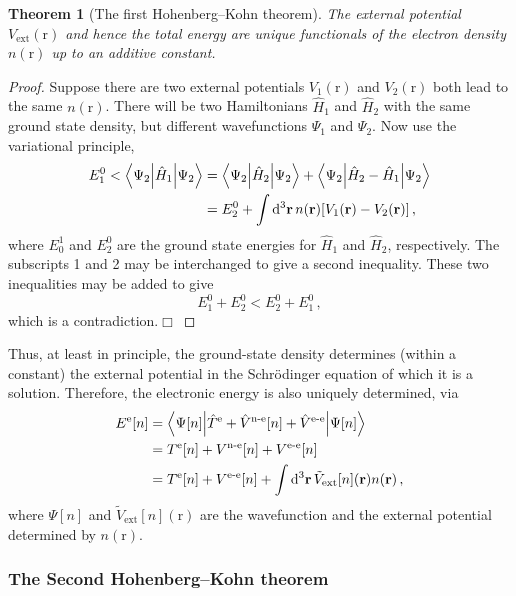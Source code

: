 \documentclass{article}
\theoremstyle{plain}\theoremheaderfont{\normalfont\itshape}\theorembodyfont{\rmfamily}\theoremseparator{.}\newtheorem*{rem}{Remark}\newtheorem*{ex}{Example}\newtheorem*{proof}{Proof}\newtheorem*{altp}{Alternative proof}
\theoremstyle{plain}\theoremheaderfont{\normalfont\bfseries}\theorembodyfont{\rmfamily}\theoremseparator{.}\newtheorem{thm}{Theorem}[section]\newtheorem{lem}[thm]{Lemma}\newtheorem{prop}[thm]{Proposition}\newtheorem*{cor}{Corollary}\newtheorem{defn}[thm]{Definition}\newtheorem{clm}[thm]{Claim}\newtheorem{clminproof}{Claim}\newtheorem{pos}{Postulate}[section]
\theoremstyle{break}\theoremheaderfont{\normalfont\itshape}\theorembodyfont{\rmfamily}\theoremseparator{.\medskip}\newtheorem*{proofskip}{Proof}\newtheorem*{exs}{Examples}\newtheorem*{rems}{Remarks}
\theoremstyle{break}\theoremheaderfont{\normalfont\bfseries}\theorembodyfont{\rmfamily}\theoremseparator{.\medskip}\newtheorem{lemskip}[thm]{Lemma}\newtheorem{defnskip}[thm]{Definition}\newtheorem{propskip}[thm]{Proposition}\newtheorem{thmskip}[thm]{Theorem}
\numberwithin{equation}{section}
\newcommand{\qed}{\hfill\ensuremath{\Box}}
\newcommand{\dd}[2][]{\mathrm{d}^{#1} #2\,}
\newcommand{\expval}[2]{\left\langle #2 \middle| #1 \middle| #2 \right\rangle}
\newcommand{\mel}[3]{\left\langle #1 \middle| #2 \middle| #3 \right\rangle}
\newcommand{\vb}[1]{\bm{\mathrm{#1}}}
\newcommand{\e}{^{\text{e}}}
\begin{document}
    \begin{thm}[The first Hohenberg--Kohn theorem]
        The external potential \(V_{\text{ext}}(\vb{r})\) and hence the total energy are unique functionals of the electron density \(n(\vb{r})\) up to an additive constant.
    \end{thm}
    \begin{proof}
        Suppose there are two external potentials \(V_{1}(\vb{r})\) and \(V_{2}(\vb{r})\) both lead to the same \(n(\vb{r})\). There will be two Hamiltonians \(\hat{H}_1\) and \(\hat{H}_2\) with the same ground state density, but different wavefunctions \(\Psi_1\) and \(\Psi_2\). Now use the variational principle,
        \begin{align}
            E_1^0<\mel{\Psi_2}{\hat{H}_1}{\Psi_2}&=\mel{\Psi_2}{\hat{H}_2}{\Psi_2}+\mel{\Psi_2}{\hat{H}_2-\hat{H}_1}{\Psi_2}\notag\\
            &=E_2^0+\int\dd[3]{\vb{r}}n(\vb{r})[V_1(\vb{r})-V_2(\vb{r})]\,,
        \end{align}
        where \(E_0^1\) and \(E_2^0\) are the ground state energies for \(\hat{H}_1\) and \(\hat{H}_2\), respectively. The subscripts 1 and 2 may be interchanged to give a second inequality. These two inequalities may be added to give
        \begin{equation}
            E_1^0+E_2^0<E_2^0+E_1^0\,,
        \end{equation}
        which is a contradiction.\qed
    \end{proof}

    Thus, at least in principle, the ground-state density determines (within a constant) the external potential in the Schr\"{o}dinger equation of which it is a solution. Therefore, the electronic energy is also uniquely determined, via
    \begin{align}
        E\e[n]&=\expval{\hat{T}\e+\hat{V}^{\text{n-e}}[n]+\hat{V}^{\text{e-e}}}{\Psi[n]}\notag\\
        &=T\e[n]+V^{\text{n-e}}[n]+V^{\text{e-e}}[n]\notag\\
        &=T\e[n]+V^{\text{e-e}}[n]+\int\dd[3]{\vb{r}} \tilde{V}_{\text{ext}}[n](\vb{r})n(\vb{r})\,,
    \end{align}
    where \(\Psi[n]\) and \(\tilde{V}_{\text{ext}}[n](\vb{r})\) are the wavefunction and the external potential determined by \(n(\vb{r})\).

    \subsubsection{The Second Hohenberg--Kohn theorem}
\end{document}
